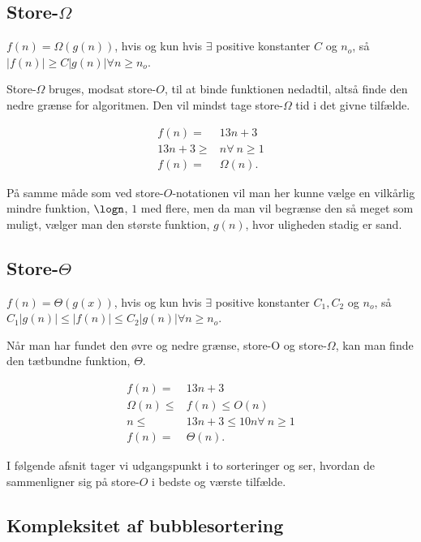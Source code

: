 \subsection{Store-$\Omega$}
\begin{defn}
$f(n) = \Omega(g(n))$, hvis og kun hvis $\exists$ positive konstanter $C$ og $n_o$, så $|f(n)| \geq C |g(n)| \forall n \geq n_o$.
\end{defn}
Store-$\Omega$ bruges, modsat store-$O$, til at binde funktionen nedadtil, altså finde den nedre grænse for algoritmen. Den vil mindst tage store-$\Omega$ tid i det givne tilfælde.
\begin{exmp}
\begin{align}
f(n)=& 13n+3 \\
13n+3 \geq& n \forall \ n \geq 1 \\
f(n) =& \Omega(n).
\end{align}
\end{exmp}

På samme måde som ved store-$O$-notationen vil man her kunne vælge en vilkårlig mindre funktion, $\logn$, $1$ med flere, men da man vil begrænse den så meget som muligt, vælger man den største funktion, $g(n)$, hvor uligheden stadig er sand.
\subsection{Store-$\Theta$}
\begin{defn}
$f(n) = \Theta(g(x))$, hvis og kun hvis $\exists$ positive konstanter $C_1, C_2$ og $n_o$, så $C_1|g(n)| \leq |f(n)| \leq C_2|g(n)| \forall n \geq n_o$.
\end{defn}
Når man har fundet den øvre og nedre grænse, store-O og store-$\Omega$, kan man finde den tætbundne funktion, $\Theta$.
\begin{exmp}
\begin{align}
f(n)=& 13n+3 \\
\Omega(n) \leq& f(n) \leq O(n) \\
n \leq& 13n+3 \leq 10n \forall \ n \geq 1 \\
f(n) =& \Theta(n).
\end{align}
\end{exmp}

I følgende afsnit tager vi udgangspunkt i to sorteringer og ser, hvordan de sammenligner sig på store-$O$ i bedste og værste tilfælde.

\subsection{Kompleksitet af bubblesortering} \label{kap:kom_bubble}

